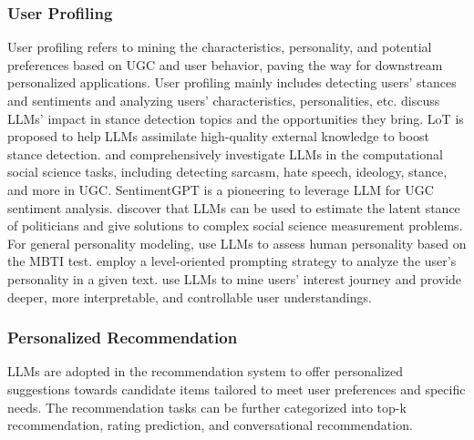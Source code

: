 \documentclass[11pt]{article}
\begin{document}
\subsubsection{User Profiling}
User profiling refers to mining the characteristics, personality, and potential preferences based on UGC and user behavior, paving the way for downstream personalized applications. 
User profiling mainly includes detecting users' stances and sentiments and analyzing users' characteristics, personalities, etc. \citet{zhang2022would} discuss LLMs' impact in stance detection topics and the opportunities they bring. LoT \cite{hu2023ladder} is proposed to help LLMs assimilate high-quality external knowledge to boost stance detection. \citet{mu2023navigating} and \citet{ziems2023can} comprehensively investigate LLMs in the computational social science tasks, including detecting sarcasm, hate speech, ideology, stance, and more in UGC. SentimentGPT \cite{kheiri2023sentimentgpt} is a pioneering to leverage LLM for UGC sentiment analysis. \citet{wu2023large} discover that LLMs can be used to estimate the latent stance of politicians and give solutions to complex social science measurement problems.
For general personality modeling, \citet{rao2023can} use LLMs to assess human personality based on the MBTI test. \citet{ji2023chatgpt} employ a level-oriented prompting strategy to analyze the user's personality in a given text. 
\citet{christakopoulou2023large} use LLMs to mine users' interest journey and provide deeper, more interpretable, and controllable user understandings.



\subsubsection{Personalized Recommendation}
\label{sec:per_recsys}
LLMs are adopted in the recommendation system to offer personalized suggestions towards candidate items tailored to meet user preferences and specific needs. The recommendation tasks can be further categorized into top-k recommendation, rating prediction, and conversational recommendation.
\end{document}
